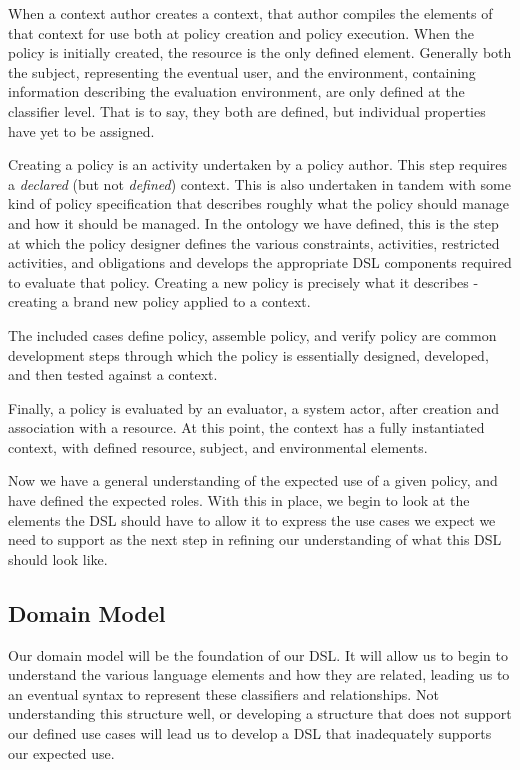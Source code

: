 When a context author creates a context, that author compiles the elements of that context for use both at policy creation and policy execution.  When the policy is initially created, the resource is the only defined element.  Generally both the subject, representing the eventual user, and the environment, containing information describing the evaluation environment, are only defined at the classifier level.  That is to say, they both are defined, but individual properties have yet to be assigned.

Creating a policy is an activity undertaken by a policy author.  This step requires a \textit{declared} (but not \textit{defined}) context.  This is also undertaken in tandem with some kind of policy specification that describes roughly what the policy should manage and how it should be managed.  In the ontology we have defined, this is the step at which the policy designer defines the various constraints, activities, restricted activities, and obligations and develops the appropriate DSL components required to evaluate that policy.  Creating a new policy is precisely what it describes - creating a brand new policy applied to a context.

The included cases define policy, assemble policy, and verify policy are common development steps through which the policy is essentially designed, developed, and then tested against a context.

Finally, a policy is evaluated by an evaluator, a system actor, after creation and association with a resource.  At this point, the context has a fully instantiated context, with defined resource, subject, and environmental elements.

Now we have a general understanding of the expected use of a given policy, and have defined the expected roles.  With this in place, we begin to look at the elements the DSL should have to allow it to express the use cases we expect we need to support as the next step in refining our understanding of what this DSL should look like.

\subsection{Domain Model}
Our domain model will be the foundation of our DSL.  It will allow us to begin to understand the various language elements and how they are related, leading us to an eventual syntax to represent these classifiers and relationships.  Not understanding this structure well, or developing a structure that does not support our defined use cases will lead us to develop a DSL that inadequately supports our expected use.

